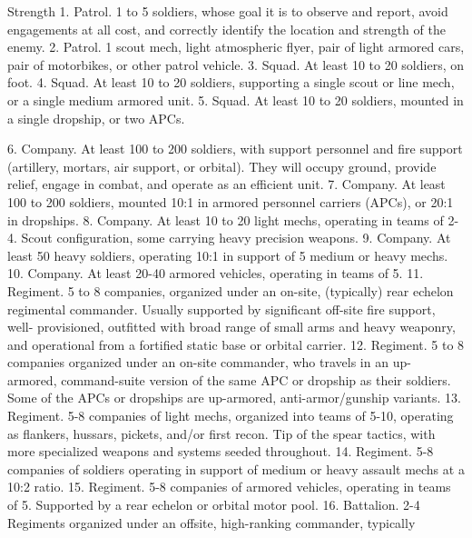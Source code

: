 Strength   
    1.  Patrol. 1 to 5 soldiers, whose goal it is to observe and report, avoid engagements at all  
        cost, and correctly identify the location and strength of the enemy.   
    2.  Patrol. 1 scout mech, light atmospheric flyer, pair of light armored cars, pair of motorbikes,  
        or other patrol vehicle.    
    3.  Squad. At least 10 to 20 soldiers, on foot.   
    4.  Squad. At least 10 to 20 soldiers, supporting a single scout or line mech, or a single  
        medium armored unit.   
    5.  Squad. At least 10 to 20 soldiers, mounted in a single dropship, or two APCs.   

                                                                                                           


6.  Company. At least 100 to 200 soldiers, with support personnel and fire support (artillery,  
    mortars, air support, or orbital). They will occupy ground, provide relief, engage in combat,  
    and operate as an efficient unit.   
7.  Company. At least 100 to 200 soldiers, mounted 10:1 in armored personnel carriers  
    (APCs), or 20:1 in dropships.  
8.  Company. At least 10 to 20 light mechs, operating in teams of 2-4. Scout configuration,  
    some carrying heavy precision weapons.  
9.  Company. At least 50 heavy soldiers, operating 10:1 in support of 5 medium or heavy  
    mechs.   
10. Company. At least 20-40 armored vehicles, operating in teams of 5.   
11. Regiment. 5 to 8 companies, organized under an on-site, (typically) rear echelon   
    regimental commander. Usually supported by significant off-site fire support, well- 
    provisioned, outfitted with broad range of small arms and heavy weaponry, and operational  
    from a fortified static base or orbital carrier.    
12. Regiment. 5 to 8 companies organized under an on-site commander, who travels in an up- 
    armored, command-suite version of the same APC or dropship as their soldiers. Some of  
    the APCs or dropships are up-armored, anti-armor/gunship variants.    
13. Regiment. 5-8 companies of light mechs, organized into teams of 5-10, operating as  
    flankers, hussars, pickets, and/or first recon. Tip of the spear tactics, with more specialized  
    weapons and systems seeded throughout.  
14. Regiment. 5-8 companies of soldiers operating in support of medium or heavy assault  
    mechs at a 10:2 ratio.   
15. Regiment. 5-8 companies of armored vehicles, operating in teams of 5. Supported by a  
    rear echelon or orbital motor pool.   
16. Battalion. 2-4 Regiments organized under an offsite, high-ranking commander, typically  
